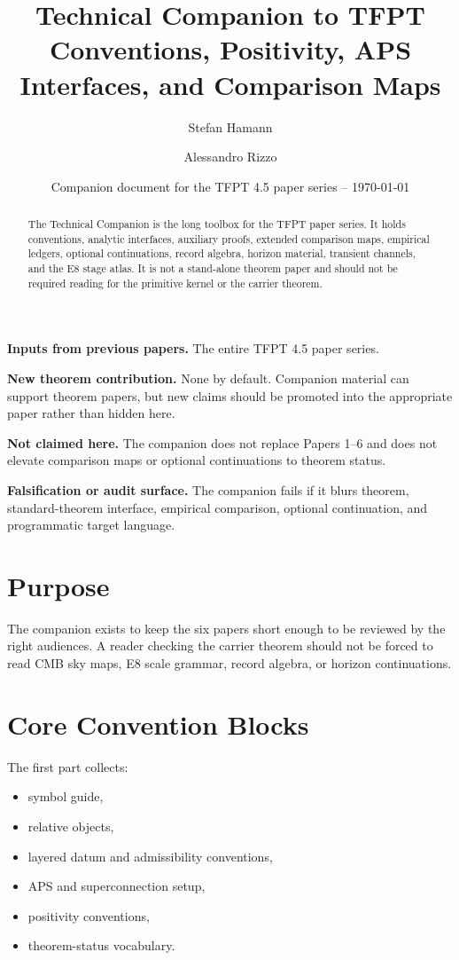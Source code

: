 \documentclass[11pt,a4paper]{article}
\title{\color{tfptblue}\textbf{Technical Companion to TFPT}\\[0.35em]
{\Large Conventions, Positivity, APS Interfaces, and Comparison Maps}}
\author{Stefan Hamann \and Alessandro Rizzo}
\date{{\normalsize\color{tfptgray}\sffamily Companion document for the TFPT 4.5 paper series -- \today}}
\begin{document}
\maketitle

\begin{abstract}
The Technical Companion is the long toolbox for the TFPT paper series. It holds conventions,
analytic interfaces, auxiliary proofs, extended comparison maps, empirical ledgers, optional
continuations, record algebra, horizon material, transient channels, and the E8 stage atlas. It is
not a stand-alone theorem paper and should not be required reading for the primitive kernel or the
carrier theorem.
\end{abstract}

\begin{tfptfrontbox}
\textbf{Inputs from previous papers.} The entire TFPT 4.5 paper series.

\textbf{New theorem contribution.} None by default. Companion material can support theorem papers,
but new claims should be promoted into the appropriate paper rather than hidden here.

\textbf{Not claimed here.} The companion does not replace Papers 1--6 and does not elevate
comparison maps or optional continuations to theorem status.

\textbf{Falsification or audit surface.} The companion fails if it blurs theorem, standard-theorem
interface, empirical comparison, optional continuation, and programmatic target language.
\end{tfptfrontbox}

\tableofcontents

\section{Purpose}

The companion exists to keep the six papers short enough to be reviewed by the right audiences. A
reader checking the carrier theorem should not be forced to read CMB sky maps, E8 scale grammar,
record algebra, or horizon continuations.

\section{Core Convention Blocks}

The first part collects:
\begin{itemize}[leftmargin=1.5em]
    \item symbol guide,
    \item relative objects,
    \item layered datum and admissibility conventions,
    \item APS and superconnection setup,
    \item positivity conventions,
    \item theorem-status vocabulary.
\end{itemize}
\end{document}
